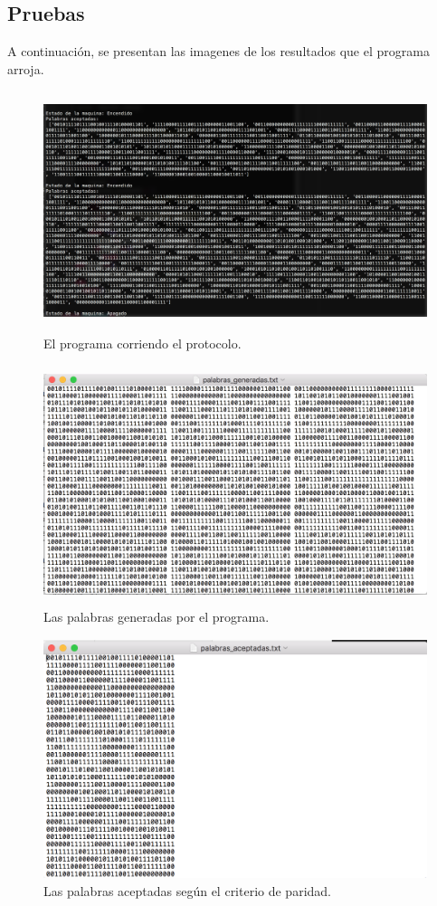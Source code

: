 \documentclass[12pt]{article}
\begin{document}
\newpage
\subsection{Pruebas}
A continuación, se presentan las imagenes de los resultados que el programa arroja.

\begin{figure}[H]
\includegraphics[width=\textwidth, height=7cm]{protocolo_encender}
\caption{El programa corriendo el protocolo.}
\label{fig:automata_protocolo_encender}
\end{figure}

\begin{figure}[H]
\includegraphics[width=\textwidth, height=7cm]{protocolo_generadas}
\caption{Las palabras generadas por el programa.}
\label{fig:automata_protocolo_generadas}
\end{figure}

\begin{figure}[H]
\includegraphics[width=\textwidth, height=7cm]{protocolo_aceptadas}
\caption{Las palabras aceptadas según el criterio de paridad.}
\label{fig:automata_protocolo_aceptadas}
\end{figure}
\end{document}
